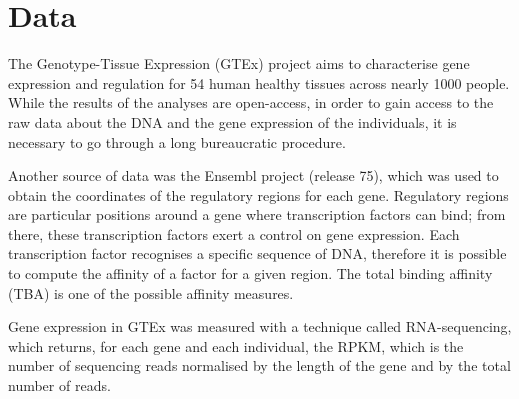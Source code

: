 \section{Data}

The Genotype-Tissue Expression (GTEx) project  
aims to characterise gene expression and regulation for 54 human healthy 
tissues across nearly 1000 people. While the results of the analyses are 
open-access, in order to gain access to the raw data about the DNA and 
the gene expression of the individuals, it is necessary to go through a 
long bureaucratic procedure.

Another source of data was the Ensembl project (release 75), 
 which was used to obtain the coordinates 
of the regulatory regions for each gene. Regulatory regions are 
particular positions around a gene where transcription factors can bind; 
from there, these transcription factors exert a control on gene 
expression. Each 
transcription factor recognises a specific sequence of DNA, therefore it 
is possible to compute the affinity of a factor for a given region. The 
total binding affinity (TBA)  is one 
of the possible affinity measures.

Gene expression in GTEx was measured with a technique called 
RNA-sequencing, which returns, for each gene and each individual, the 
RPKM,  which is the number of sequencing 
reads normalised by the length of the gene and by the total number of 
reads.

